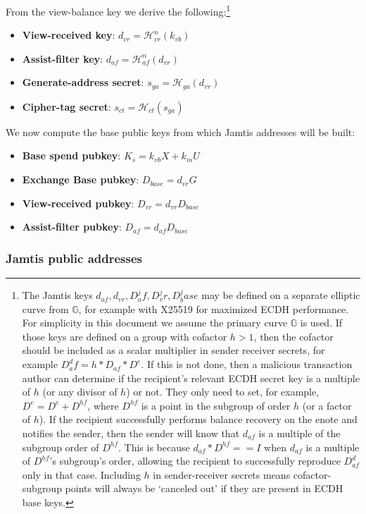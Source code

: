 From the view-balance key we derive the following:\footnote{The Jamtis keys $d_{af}, d_{vr}, D^j_af, D^j_vr, D^j_base$ may be defined on a separate elliptic curve from $\mathbb{G}$, for example with X25519 for maximized ECDH performance. For simplicity in this document we assume the primary curve $\mathbb{G}$ is used. If those keys are defined on a group with cofactor $h > 1$, then the cofactor should be included as a scalar multiplier in sender receiver secrets, for example $D^d_af = h * D_{af} * D^e$. If this is not done, then a malicious transaction author can determine if the recipient's relevant ECDH secret key is a multiple of $h$ (or any divisor of $h$) or not. They only need to set, for example, $D^e = D^e + D^{hf}$, where $D^{hf}$ is a point in the subgroup of order $h$ (or a factor of $h$). If the recipient successfully performs balance recovery on the enote and notifies the sender, then the sender will know that $d_{af}$ is a multiple of the subgroup order of $D^{hf}$. This is because $d_{af} * D^{hf} == I$ when $d_{af}$ is a multiple of $D^{hf}$'s subgroup's order, allowing the recipient to successfully reproduce $D^d_{af}$ only in that case. Including $h$ in sender-receiver secrets means cofactor-subgroup points will always be `canceled out' if they are present in ECDH base keys.}
\begin{itemize}
    \item \textbf{View-received key}: $d_{vr} = \mathcal{H}^n_{vr}(k_{vb})$
    \item \textbf{Assist-filter key}: $d_{af} = \mathcal{H}^n_{af}(d_{vr})$
    \item \textbf{Generate-address secret}: $s_{ga} = \mathcal{H}_{ga}(d_{vr})$
    \item \textbf{Cipher-tag secret}: $s_{ct} = \mathcal{H}_{ct}(s_{ga})$
\end{itemize}

We now compute the base public keys from which Jamtis addresses will be built:
\begin{itemize}
    \item \textbf{Base spend pubkey}: $K_s = k_{vb} X + k_m U$
    \item \textbf{Exchange Base pubkey}: $D_{base} = d_{vr} G$
    \item \textbf{View-received pubkey}: $D_{vr} = d_{vr} D_{base}$
    \item \textbf{Assist-filter pubkey}: $D_{af} = d_{af} D_{base}$
\end{itemize}

\subsubsection{Jamtis public addresses}
\label{subsubsec:jamtis-public-addresses}

